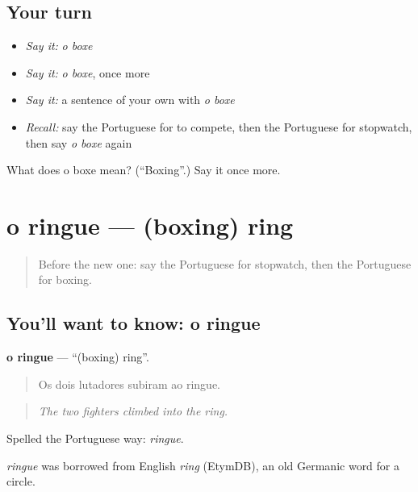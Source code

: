 \subsection*{Your turn}
\begin{itemize}
\raggedright
  \item \emph{Say it:} \emph{o boxe}
  \item \emph{Say it:} \emph{o boxe}, once more
  \item \emph{Say it:} a sentence of your own with \emph{o boxe}
  \item \emph{Recall:} say the Portuguese for to compete, then the Portuguese for stopwatch, then say \emph{o boxe} again
\end{itemize}

\begin{tcolorbox}[breakable,colback=teal!4,colframe=teal!35!black,title={Before you move on}]
What does o boxe mean? (\textquotedblleft{}Boxing\textquotedblright{}.) Say it once more.
\end{tcolorbox}
\section[o ringue]{o ringue — (boxing) ring}

\label{lesson:PT-C514-ringue}



\begin{quote}
Before the new one: say the Portuguese for stopwatch, then the Portuguese for boxing.
\end{quote}

\subsection*{You'll want to know: o ringue}
\textbf{o ringue} — \textquotedblleft{}(boxing) ring\textquotedblright{}.

\begin{quote}
Os dois lutadores subiram ao ringue.
\end{quote}

\begin{quote}
\emph{The two fighters climbed into the ring.}
\end{quote}

Spelled the Portuguese way: \emph{ringue}.

\begin{cousinweb}
\emph{ringue} was borrowed from English \emph{ring} (EtymDB), an old Germanic word for a circle.
\end{cousinweb}

